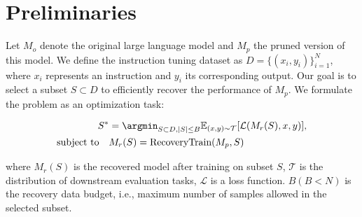 \section{Preliminaries}
Let $M_o$ denote the original large language model and $M_p$ the pruned version of this model. We define the instruction tuning dataset as $D = \{(x_i, y_i)\}_{i=1}^N$, where $x_i$ represents an instruction and $y_i$ its corresponding output. Our goal is to select a subset $S \subset D$ to efficiently recover the performance of $M_p$. We formulate the problem as an optimization task:

\begin{equation}
\begin{aligned}
    S^* &= \argmin_{S \subset D, |S| \leq B} \mathbb{E}_{(x,y) \sim \mathcal{T}} [\mathcal{L}(M_r(S), x, y)],\\
    \text{subject to}\quad &M_r(S) = \text{RecoveryTrain}(M_p, S) 
\end{aligned}    
\end{equation}

where $M_r(S)$ is the recovered model after training on subset $S$, $\mathcal{T}$ is the distribution of downstream evaluation tasks, $\mathcal{L}$ is a loss function. $B (B < N)$ is the recovery data budget, i.e., maximum number of samples allowed in the selected subset.




